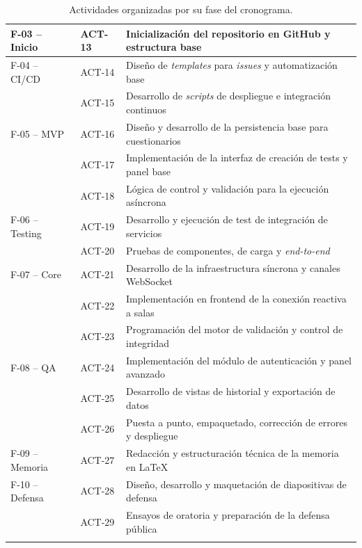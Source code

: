 \begin{table}[H]
{\begin{tabularx}{1.1\textwidth}{llY}
F-03 -- Inicio & ACT-13\label{act:13} & Inicialización del repositorio en GitHub y estructura base \\ \hline

F-04 -- CI/CD & ACT-14\label{act:14} & Diseño de \textit{templates} para \textit{issues} y automatización base \\ 
& ACT-15\label{act:15} & Desarrollo de \textit{scripts} de despliegue e integración continuos \\ \hline

F-05 -- MVP & ACT-16\label{act:16} & Diseño y desarrollo de la persistencia base para cuestionarios \\ 
& ACT-17\label{act:17} & Implementación de la interfaz de creación de tests y panel base \\ 
& ACT-18\label{act:18} & Lógica de control y validación para la ejecución asíncrona \\ \hline

F-06 -- Testing & ACT-19\label{act:19} & Desarrollo y ejecución de test de integración de servicios \\ 
& ACT-20\label{act:20} & Pruebas de componentes, de carga y \textit{end-to-end} \\ \hline

F-07 -- Core & ACT-21\label{act:21} & Desarrollo de la infraestructura síncrona y canales WebSocket \\ 
& ACT-22\label{act:22} & Implementación en frontend de la conexión reactiva a salas \\ 
& ACT-23\label{act:23} & Programación del motor de validación y control de integridad \\ \hline

F-08 -- QA & ACT-24\label{act:24} & Implementación del módulo de autenticación y panel avanzado \\ 
& ACT-25\label{act:25} & Desarrollo de vistas de historial y exportación de datos \\ 
& ACT-26\label{act:26} & Puesta a punto, empaquetado, corrección de errores y despliegue \\ \hline

F-09 -- Memoria & ACT-27\label{act:27} & Redacción y estructuración técnica de la memoria en LaTeX \\ \hline

F-10 -- Defensa & ACT-28\label{act:28} & Diseño, desarrollo y maquetación de diapositivas de defensa \\ 
& ACT-29\label{act:29} & Ensayos de oratoria y preparación de la defensa pública \\ \bighline
\end{tabularx}%
}
\caption{Actividades organizadas por su fase del cronograma.}
\label{tab:lista_actividades}
\end{table}

